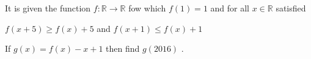 It is given the function $f:\mathbb{R}\rightarrow \mathbb{R}$ fow which $f(1)=1$ and for all $x\in\mathbb{R}$ satisfied

$f(x+5)\geq f(x)+5$ and $f(x+1)\leq f(x)+1$

If $g(x)=f(x)-x+1$ then find $g(2016)$ .